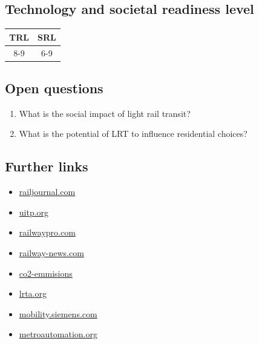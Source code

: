 \documentclass[
]{book}
\providecommand{\tightlist}{%
  \setlength{\itemsep}{0pt}\setlength{\parskip}{0pt}}
\begin{document}
\hypertarget{technology-and-societal-readiness-level-38}{%
\subsection*{Technology and societal readiness level}\label{technology-and-societal-readiness-level-38}}

\begin{longtable}[]{@{}cc@{}}
\toprule
TRL & SRL\tabularnewline
\midrule
\endhead
8-9 & 6-9\tabularnewline
\bottomrule
\end{longtable}

\hypertarget{open-questions-38}{%
\subsection*{Open questions}\label{open-questions-38}}

\begin{enumerate}
\def\labelenumi{\arabic{enumi}.}
\tightlist
\item
  What is the social impact of light rail transit?
\item
  What is the potential of LRT to influence residential choices?
\end{enumerate}

\hypertarget{further-links-33}{%
\subsection{Further links}\label{further-links-33}}

\begin{itemize}
\tightlist
\item
  \href{https://www.railjournal.com/category/passenger/light-rail/}{railjournal.com}
\item
  \href{https://www.uitp.org/topics/light-rail/}{uitp.org}
\item
  \href{https://www.railwaypro.com/wp/}{railwaypro.com}
\item
  \href{https://railway-news.com/}{railway-news.com}
\item
  \href{https://ourworldindata.org/co2-emissions-from-transport}{co2-emmisions}
\item
  \href{http://www.lrta.org/}{lrta.org}
\item
  \href{https://www.mobility.siemens.com/global/en/portfolio/rail/rolling-stock/trams-and-light-rail/autonomous-tram.html}{mobility.siemens.com}
\item
  \href{https://metroautomation.org/what-makes-automation-possible/}{metroautomation.org}
\end{itemize}
\end{document}
